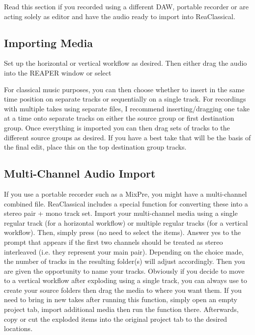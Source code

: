 \documentclass[10pt,american]{article}
\begin{document}
Read this section if you recorded using a different DAW, portable recorder or
are acting solely as editor and have the audio ready to import into
ReaClassical. 

\subsection{Importing Media}

Set up the horizontal or vertical workflow as desired. Then either drag the
audio into the REAPER window or select 

For classical music purposes, you can then choose whether to insert in the same
time position on separate tracks or sequentially on a single track. For
recordings with multiple takes using separate files, I recommend
inserting/dragging one take at a time onto separate tracks on either the source
group or first destination group. Once everything is imported you can then drag
sets of tracks to the different source groups as desired. If you have a best
take that will be the basis of the final edit, place this on the top destination
group tracks.

\subsection{Multi-Channel Audio Import}

If you use a portable recorder such as a MixPre, you might have a multi-channel
combined file. ReaClassical includes a special function for converting these
into a stereo pair + mono track set. Import your multi-channel media using a
single regular track (for a horizontal workflow) or multiple regular tracks (for
a vertical workflow). Then, simply press  (no need to select the
items). Answer yes to the prompt that appears if the first two channels should
be treated as stereo interleaved (i.e. they represent your main pair). Depending
on the choice made, the number of tracks in the resulting folder(s) will adjust
accordingly. Then you are given the opportunity to name your tracks. Obviously
if you decide to move to a vertical workflow after exploding using a single
track, you can always use  to create your source folders then drag the
media to where you want them. If you need to bring in new takes after running
this function, simply open an empty project tab, import additional media then
run the function there. Afterwards, copy or cut the exploded items into the
original project tab to the desired locations.
\end{document}
